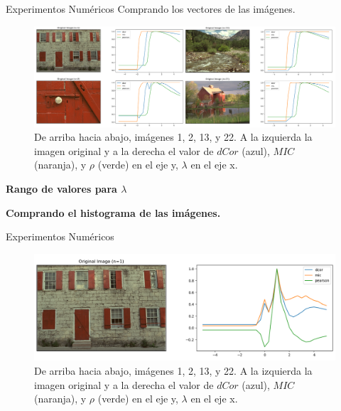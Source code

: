 \documentclass{beamer}
\begin{document}
\begin{frame}{Experimentos Numéricos}
    Comprando los vectores de las imágenes.
    \begin{figure}[H]
        \centering
        \includegraphics[width=\textwidth]{lam_v_com_all_img.png}
        \caption{De arriba hacia abajo, im\'agenes 1, 2, 13, y 22. A la izquierda la imagen original y a la derecha el valor de $dCor$ (azul), $MIC$ (naranja), y $\rho$ (verde) en el eje y, $\lambda$ en el eje x.}
    \end{figure}
\end{frame}


\begin{frame}
    \begin{center}
        {\LARGE\bf Rango de valores para $\lambda$}
    \end{center}
    \begin{center}
        {\Large\bf Comprando el histograma de las imágenes.}
    \end{center}
\end{frame}
\begin{frame}{Experimentos Numéricos}
    \begin{figure}[H]
        \centering
        \includegraphics[width=\textwidth]{lam_v_com_one_hist.png}
        \caption{De arriba hacia abajo, im\'agenes 1, 2, 13, y 22. A la izquierda la imagen original y a la derecha el valor de $dCor$ (azul), $MIC$ (naranja), y $\rho$ (verde) en el eje y, $\lambda$ en el eje x.}
    \end{figure}
\end{frame}
\end{document}
